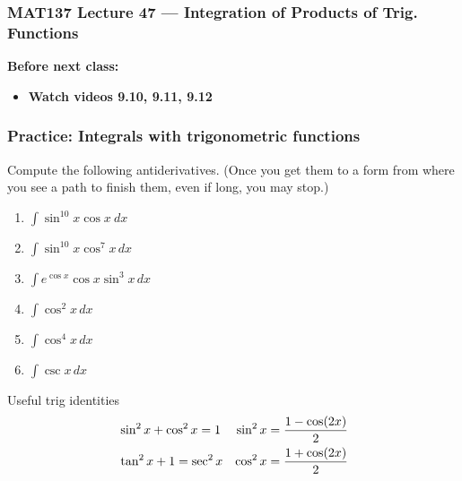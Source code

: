 \documentclass[14pt]{beamer}
\newcommand{\setsize}[1]{\fontsize{#1}{#1}\selectfont} %
\newcommand{\smallerfont}{\setsize{13}} %
\newcommand{\vv}{\vspace{.2cm}}
\begin{document}
\begin{frame}
	\frametitle{MAT137 Lecture 47 --- Integration of Products of Trig{.} Functions}

	\vfill
	{\bf Before next class:}
		\begin{itemize} \normalsize
			\item {\bf Watch videos 9.10, 9.11, 9.12}
		\end{itemize}
\end{frame}
	\begin{frame}[t]
		\smallerfont
		\frametitle{Practice: Integrals with trigonometric functions}

		Compute the following antiderivatives. (Once you get them to a form from
		where you see a path to finish them, even if long, you may stop.)

		\begin{multicols}{2}
			\begin{enumerate}
				\item ${\displaystyle  \int \sin^{10} x \cos x \ dx }$ \vv

				\item ${\displaystyle \int \sin^{10} x \cos^{7} x \, dx}$ \vv

				\item ${\displaystyle \int e^{\cos x} \cos x \sin^3 x \, dx}$ \vv

				\item ${\displaystyle \int \cos^2 x \, dx}$ \vv

				\item ${\displaystyle \int \cos^4x \, dx}$ \vv

				\item ${\displaystyle \int \csc x \, dx}$ \vv
			\end{enumerate}
		\end{multicols}

		\vspace{-.5cm}
		{\setsize{10} \begin{block}{ \setsize{12} Useful trig identities}\vspace{-.5cm} \begin{align*}\large&\sin^{2} x + \cos^{2} x = 1&\sin^{2} x&= \frac{1 - \cos (2x)}{2}\\&\tan^{2} x + 1 = \sec^{2} x&\cos^{2} x&= \frac{1 + \cos (2x)}{2}\end{align*}\end{block} }
	\end{frame}
\end{document}
